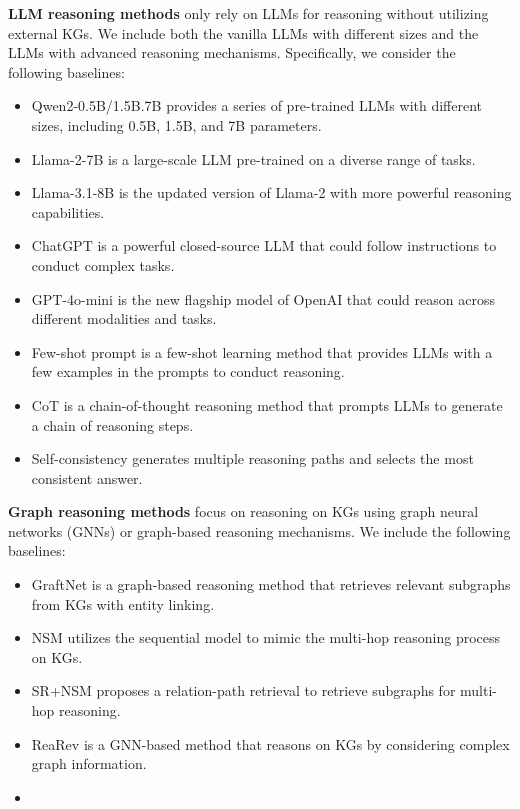 \noindent\textbf{LLM reasoning methods} only rely on LLMs for reasoning without utilizing external KGs. We include both the vanilla LLMs with different sizes and the LLMs with advanced reasoning mechanisms. Specifically, we consider the following baselines:
\begin{itemize}
    \item Qwen2-0.5B/1.5B.7B \citep{qwen2} provides a series of pre-trained LLMs with different sizes, including 0.5B, 1.5B, and 7B parameters.
    \item Llama-2-7B \citep{touvron2023llama} is a large-scale LLM pre-trained on a diverse range of tasks.
    \item Llama-3.1-8B \citep{llama3} is the updated version of Llama-2 with more powerful reasoning capabilities.
    \item ChatGPT \citep{chatgpt} is a powerful closed-source LLM that could follow instructions to conduct complex tasks.
    \item GPT-4o-mini \citep{gpt4o} is the new flagship model of OpenAI that could reason across different modalities and tasks.
    \item Few-shot prompt \citep{brown2020language} is a few-shot learning method that provides LLMs with a few examples in the prompts to conduct reasoning.
    \item CoT \citep{wei2022chain} is a chain-of-thought reasoning method that prompts LLMs to generate a chain of reasoning steps.
    \item Self-consistency \citep{wangself} generates multiple reasoning paths and selects the most consistent answer.
\end{itemize}

\noindent\textbf{Graph reasoning methods} focus on reasoning on KGs using graph neural networks (GNNs) \citep{wu2020comprehensive} or graph-based reasoning mechanisms. We include the following baselines:
\begin{itemize}
    \item GraftNet \citep{sun2018open} is a graph-based reasoning method that retrieves relevant subgraphs from KGs with entity linking.
    \item NSM \citep{he2021improving} utilizes the sequential model to mimic the multi-hop reasoning process on KGs.
    \item SR+NSM \citep{zhang2022subgraph} proposes a relation-path retrieval to retrieve subgraphs for multi-hop reasoning.
    \item ReaRev \citep{mavromatis2022rearev} is a GNN-based method that reasons on KGs by considering complex graph information.
    \item {}
\end{itemize}

